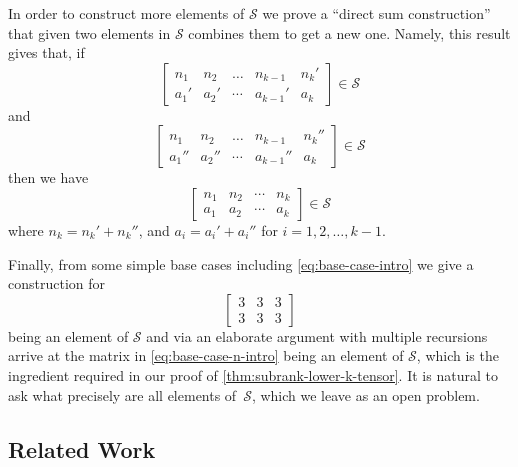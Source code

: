 \documentclass[11pt]{article}
\theoremstyle{definition}
\theoremstyle{remark}
\begin{document}
In order to construct more elements of $\mathcal{S}$ we prove a ``direct sum construction'' that given two elements in $\mathcal{S}$ combines them to get a new one. Namely, this result gives that, if
\[
\begin{bmatrix} n_1 & n_2 & \dots & n_{k-1} & n_k'\\
a_1' & a_2' & \cdots & a_{k-1}' & a_k\end{bmatrix} \in \mathcal{S}
\]
and
\[
\begin{bmatrix} n_1 & n_2 & \dots & n_{k-1} & n_k''\\
a_1'' & a_2'' & \cdots & a_{k-1}'' & a_k\end{bmatrix} \in \mathcal{S}
\]
then we have 
\[
\begin{bmatrix} 
n_1 & n_2 & \cdots & n_k\\
a_1 & a_2  & \cdots & a_k
\end{bmatrix}\in \mathcal{S}
\]
where $n_k=n_k'+n_k''$, and $a_i=a_i'+a_i''$ for $i=1,2,\dots,k-1$.

Finally, from some simple base cases including \eqref{eq:base-case-intro} we give a construction for 
\[ %
\begin{bmatrix} 3 & 3 & 3\\3 & 3 & 3\end{bmatrix}
\] %
being an element of $\mathcal{S}$
and via an elaborate argument with multiple recursions arrive at the matrix in \eqref{eq:base-case-n-intro} being an element of $\mathcal{S}$, which is the ingredient required in our proof of \autoref{thm:subrank-lower-k-tensor}. It is natural to ask what precisely are all elements of~$\mathcal{S}$, which we leave as an open problem.


\subsection{Related Work}\label{subsec:related}
\end{document}

